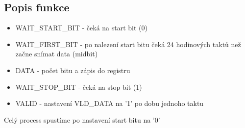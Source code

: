 \documentclass[a4paper, 11pt]{article}
\begin{document}
	\subsection{Popis funkce}
	\begin{itemize}
	    \item WAIT\_START\_BIT - čeká na start bit (0)
	    \item WAIT\_FIRST\_BIT - po nalezení start bitu čeká 24 hodinových taktů než začne snímat data (midbit)
	    \item DATA - počet bitu a zápis do registru
	    \item WAIT\_STOP\_BIT - čeká na stop bit (1)
	    \item VALID - nastavení VLD\_DATA na '1' po dobu jednoho taktu
	\end{itemize}
	Celý process spustíme po nastavení start bitu na '0'


	
\end{document}
